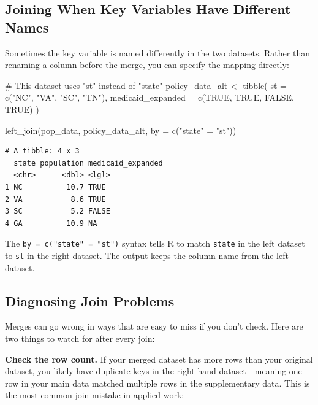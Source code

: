 \documentclass[
  letterpaper,
  DIV=11,
  numbers=noendperiod]{scrreprt}
\newenvironment{Shaded}{\begin{snugshade}}{\end{snugshade}}
\newcommand{\AttributeTok}[1]{\textcolor[rgb]{0.40,0.45,0.13}{#1}}
\newcommand{\CommentTok}[1]{\textcolor[rgb]{0.37,0.37,0.37}{#1}}
\newcommand{\ConstantTok}[1]{\textcolor[rgb]{0.56,0.35,0.01}{#1}}
\newcommand{\FunctionTok}[1]{\textcolor[rgb]{0.28,0.35,0.67}{#1}}
\newcommand{\NormalTok}[1]{\textcolor[rgb]{0.00,0.23,0.31}{#1}}
\newcommand{\OtherTok}[1]{\textcolor[rgb]{0.00,0.23,0.31}{#1}}
\newcommand{\StringTok}[1]{\textcolor[rgb]{0.13,0.47,0.30}{#1}}
\begin{document}
\subsection{Joining When Key Variables Have Different
Names}\label{joining-when-key-variables-have-different-names}

Sometimes the key variable is named differently in the two datasets.
Rather than renaming a column before the merge, you can specify the
mapping directly:

\begin{Shaded}
\begin{Highlighting}[]
\CommentTok{\# This dataset uses "st" instead of "state"}
\NormalTok{policy\_data\_alt }\OtherTok{\textless{}{-}} \FunctionTok{tibble}\NormalTok{(}
    \AttributeTok{st =} \FunctionTok{c}\NormalTok{(}\StringTok{"NC"}\NormalTok{, }\StringTok{"VA"}\NormalTok{, }\StringTok{"SC"}\NormalTok{, }\StringTok{"TN"}\NormalTok{),}
    \AttributeTok{medicaid\_expanded =} \FunctionTok{c}\NormalTok{(}\ConstantTok{TRUE}\NormalTok{, }\ConstantTok{TRUE}\NormalTok{, }\ConstantTok{FALSE}\NormalTok{, }\ConstantTok{TRUE}\NormalTok{)}
\NormalTok{)}

\FunctionTok{left\_join}\NormalTok{(pop\_data, policy\_data\_alt, }\AttributeTok{by =} \FunctionTok{c}\NormalTok{(}\StringTok{"state"} \OtherTok{=} \StringTok{"st"}\NormalTok{))}
\end{Highlighting}
\end{Shaded}

\begin{verbatim}
# A tibble: 4 x 3
  state population medicaid_expanded
  <chr>      <dbl> <lgl>            
1 NC          10.7 TRUE             
2 VA           8.6 TRUE             
3 SC           5.2 FALSE            
4 GA          10.9 NA               
\end{verbatim}

The \texttt{by\ =\ c("state"\ =\ "st")} syntax tells R to match
\texttt{state} in the left dataset to \texttt{st} in the right dataset.
The output keeps the column name from the left dataset.

\subsection{Diagnosing Join Problems}\label{diagnosing-join-problems}

Merges can go wrong in ways that are easy to miss if you don't check.
Here are two things to watch for after every join:

\textbf{Check the row count.} If your merged dataset has more rows than
your original dataset, you likely have duplicate keys in the right-hand
dataset---meaning one row in your main data matched multiple rows in the
supplementary data. This is the most common join mistake in applied
work:
\end{document}
